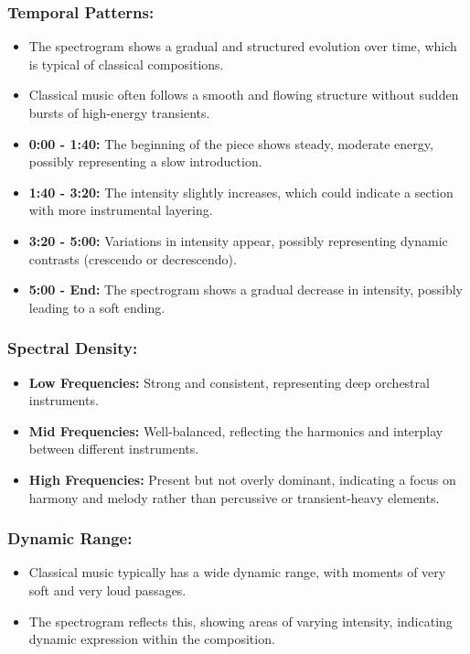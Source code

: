 \documentclass[a4paper,12pt]{article}
\begin{document}
\subsubsection{Temporal Patterns:}
\begin{itemize}
    \item The spectrogram shows a gradual and structured evolution over time, which is typical of classical compositions.
    \item Classical music often follows a smooth and flowing structure without sudden bursts of high-energy transients.
    \item \textbf{0:00 - 1:40:} The beginning of the piece shows steady, moderate energy, possibly representing a slow introduction.
    \item \textbf{1:40 - 3:20:} The intensity slightly increases, which could indicate a section with more instrumental layering.
    \item \textbf{3:20 - 5:00:} Variations in intensity appear, possibly representing dynamic contrasts (crescendo or decrescendo).
    \item \textbf{5:00 - End:} The spectrogram shows a gradual decrease in intensity, possibly leading to a soft ending.
\end{itemize}
\subsubsection{Spectral Density:}
\begin{itemize}
    \item \textbf{Low Frequencies:}  Strong and consistent, representing deep orchestral instruments.
    \item \textbf{Mid Frequencies:} Well-balanced, reflecting the harmonics and interplay between different instruments.
    \item \textbf{High Frequencies:} Present but not overly dominant, indicating a focus on harmony and melody rather than percussive or transient-heavy elements.
\end{itemize}
\subsubsection{Dynamic Range:}
\begin{itemize}
    \item Classical music typically has a wide dynamic range, with moments of very soft and very loud passages.
    \item The spectrogram reflects this, showing areas of varying intensity, indicating dynamic expression within the composition.
\end{itemize}
\end{document}
